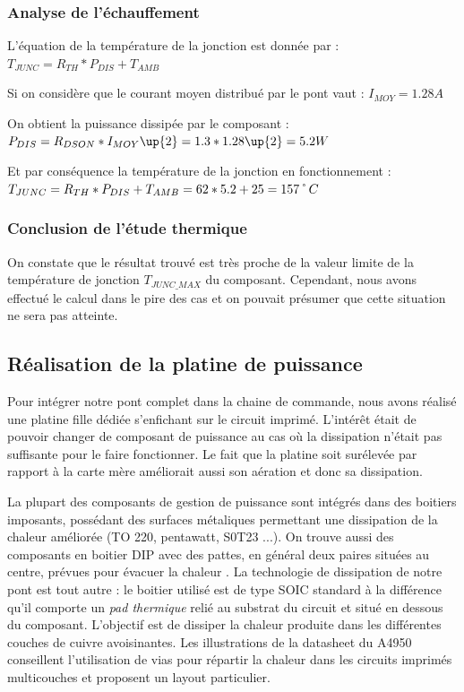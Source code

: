 \documentclass[11pt, french]{article} %
\begin{document}
\subsubsection{Analyse de l'échauffement}

\noindent
L'équation de la température de la jonction est donnée par : \newline
\medskip
\noindent
$ T_{JUNC} = R_{TH} * P_{DIS} + T_{AMB} $

\medskip
\noindent
Si on considère que le courant moyen distribué par le pont vaut : \newline
$ I_{MOY} = 1.28 A $

\medskip
\noindent
On obtient la puissance dissipée par le composant : \newline
$ P_{DIS} = R_{DSON} * I_{MOY}\up{2} = 1.3 * 1.28\up{2} = 5.2 W $

\medskip
\noindent
Et par conséquence la température de la jonction en fonctionnement : \newline
$ T_{JUNC} = R_{TH} * P_{DIS} +  T_{AMB} = 62 * 5.2 + 25 = 157 \char23 C $

\subsubsection{Conclusion de l'étude thermique}

	On constate que le résultat trouvé est très proche de la valeur limite de la température de jonction $ T_{JUNC\_{MAX}} $ du composant. Cependant, nous avons effectué le calcul dans le pire des cas et on pouvait présumer que cette situation ne sera pas atteinte.

\subsection{Réalisation de la platine de puissance}
Pour intégrer notre pont complet dans la chaine de commande, nous avons réalisé une platine fille dédiée s'enfichant sur le circuit imprimé. L'intérêt était de pouvoir changer de composant de puissance au cas où la dissipation n'était pas suffisante pour le faire fonctionner. Le fait que la platine soit surélevée par rapport à la carte mère améliorait aussi son aération et donc sa dissipation.

La plupart des composants de gestion de puissance sont intégrés dans des boitiers imposants, possédant des surfaces métaliques permettant une dissipation de la chaleur améliorée (TO 220, pentawatt, S0T23 ...). On trouve aussi des composants en boitier DIP avec des pattes, en général deux paires situées au centre, prévues pour évacuer la chaleur . La technologie de dissipation de notre pont est tout autre : le boitier utilisé est de type SOIC standard à la différence qu'il comporte un \emph{pad thermique} relié au substrat du circuit et situé en dessous du composant. L'objectif est de dissiper la chaleur produite dans les différentes couches de cuivre avoisinantes. Les illustrations de la datasheet du A4950 conseillent l'utilisation de vias pour répartir la chaleur dans les circuits imprimés multicouches et proposent un layout particulier.
\end{document}
